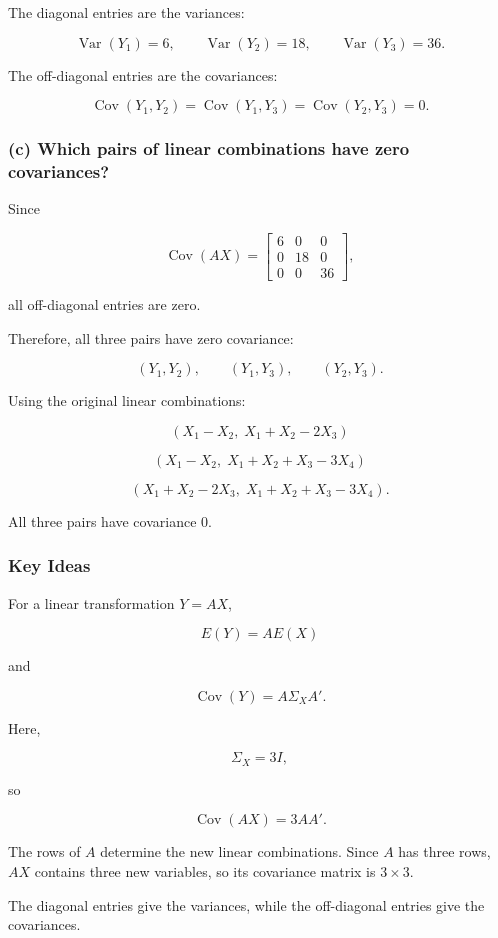 \documentclass[12pt]{article}
\begin{document}
	The diagonal entries are the variances:
	
	\[
	\operatorname{Var}(Y_1)=6,
	\qquad
	\operatorname{Var}(Y_2)=18,
	\qquad
	\operatorname{Var}(Y_3)=36.
	\]
	
	The off-diagonal entries are the covariances:
	
	\[
	\operatorname{Cov}(Y_1,Y_2)
	=
	\operatorname{Cov}(Y_1,Y_3)
	=
	\operatorname{Cov}(Y_2,Y_3)
	=0.
	\]
	
	
	\subsubsection*{(c) Which pairs of linear combinations have zero covariances?}
	
	Since
	
	\[
	\operatorname{Cov}(AX)
	=
	\begin{bmatrix}
		6&0&0\\
		0&18&0\\
		0&0&36
	\end{bmatrix},
	\]
	
	all off-diagonal entries are zero.
	
	Therefore, all three pairs have zero covariance:
	
	\[
	\boxed{
		(Y_1,Y_2),\qquad
		(Y_1,Y_3),\qquad
		(Y_2,Y_3)
	}.
	\]
	
	Using the original linear combinations:
	
	\[
	\boxed{
		(X_1-X_2,\;X_1+X_2-2X_3)
	}
	\]
	
	\[
	\boxed{
		(X_1-X_2,\;X_1+X_2+X_3-3X_4)
	}
	\]
	
	\[
	\boxed{
		(X_1+X_2-2X_3,\;
		X_1+X_2+X_3-3X_4)
	}.
	\]
	
	All three pairs have covariance $0$.
	
	
	\subsubsection*{Key Ideas}
	
	For a linear transformation $Y=AX$,
	
	\[
	\boxed{
		E(Y)=AE(X)
	}
	\]
	
	and
	
	\[
	\boxed{
		\operatorname{Cov}(Y)=A\Sigma_XA'
	}.
	\]
	
	Here,
	
	\[
	\Sigma_X=3I,
	\]
	
	so
	
	\[
	\boxed{
		\operatorname{Cov}(AX)=3AA'
	}.
	\]
	
	The rows of $A$ determine the new linear combinations.
	Since $A$ has three rows, $AX$ contains three new variables,
	so its covariance matrix is $3\times3$.
	
	The diagonal entries give the variances, while the
	off-diagonal entries give the covariances.
	
\end{document}
